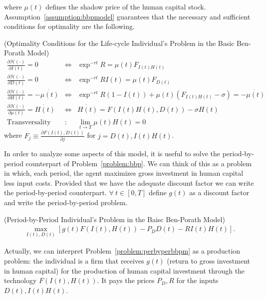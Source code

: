 \noindent where $\mu(t)$ defines the shadow price of the human capital stock. Assumption~\ref{assumption:bbpmodel} guarantees that the necessary and sufficient conditions for optimality are the following.
\begin{condition} (Optimality Conditions for the Life-cycle Individual's Problem in the Basic Ben-Porath Model) 
\begin{eqnarray}
\frac{\partial \mathcal{H} (\cdot)}{\partial I(t)} = 0 &\Leftrightarrow& \exp^{-rt}R = \mu(t) F_{I(t)H(t)} \label{eq:focinvestment} \\
\frac{\partial \mathcal{H} (\cdot)}{\partial D(t)} = 0 &\Leftrightarrow& \exp^{-rt}R I(t) = \mu(t) F_{D(t)} \label{eq:focgoods} \\
\frac{\partial \mathcal{H} (\cdot)}{\partial H(t)} = - \dot{\mu(t)} &\Leftrightarrow& \exp^{-rt} R \left( 1 - I (t) \right) + \mu(t) \left(  F_{I(t)H(t)} - \sigma \right) = - \dot{\mu(t)} \label{eq:focstock} \\ 
\frac{\partial \mathcal{H} (\cdot)}{\partial \mu(t)} = \dot{H(t)} &\Leftrightarrow& \dot{H(t)} = F \left( I(t) H(t), D(t) \right) - \sigma H(t) \label{eq:focmotion} \\
\text{Transversality} &:& \lim_{t \rightarrow T} \mu(t) H(t) = 0 \label{eq:foctransversality}
\end{eqnarray}
where $F_{j} \equiv \frac{\partial F \left( I(t), D(t) \right) }{\partial j}$ for $j = D(t), I(t) H(t)$.
\end{condition}

\indent In order to analyze some aspects of this model, it is useful to solve the period-by-period counterpart of Problem~\ref{problem:bbp}. We can think of this as a problem in which, each period, the agent maximizes gross investment in human capital less input costs. Provided that we have the adequate discount factor we can write the period-by-period counterpart. $ \forall \ t \in [0,T]$ define $g(t)$ as a discount factor and write the period-by-period problem.
\begin{problem} (Period-by-Period Individual's Problem in the Baisc Ben-Porath Model)\label{problem:perbyperbbpm}
\begin{eqnarray}
\max_{I(t),D(t)} \left[ g(t) F \left( I(t),H(t) \right) - P_{D}D(t) - RI(t)H(t) \right]. \nonumber
\end{eqnarray}
\end{problem} 

\indent Actually, we can interpret Problem~\ref{problem:perbyperbbpm} as a production problem: the individual is a firm that receives $g(t)$ (return to gross investment in human capital) for the production of human capital investment through the technology $F \left( I(t),H(t) \right)$. It pays the prices $P_{D}, R$ for the inputs $D(t), I(t)H(t)$.

